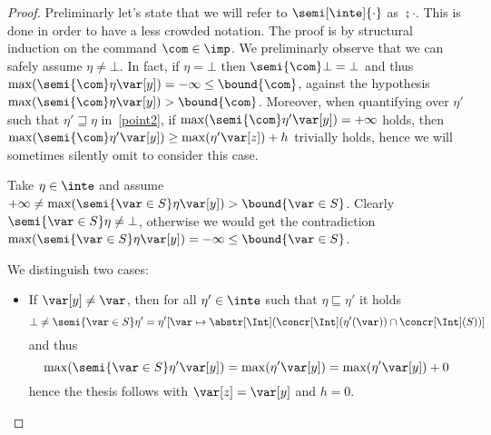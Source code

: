 \begin{proof}
  Preliminarly let's state that we will refer to
  \(\semi[\inte]{\cdot}\) as \(\semi{\cdot}\). This is done in order
  to have a less crowded notation. The proof is by structural
  induction on the command \(\com\in \imp\).
  We preliminarly observe that we can safely assume
  \(\eta \neq \bot\).
  In fact, if \(\eta = \bot\) then \(\semi{\com} \bot = \bot\) and
  thus \(\max(\semi{\com} \eta \var[y]) = -\infty \leq \bound{\com}\),
  against the hypothesis
  \(\max(\semi{\com}\eta \var[y]) > \bound{\com}\). Moreover, when
  quantifying over \(\eta'\) such that \(\eta' \sqsupseteq \eta\)
  in~\ref{point2}, if \(\max(\semi{\com}\eta' \var[y]) = + \infty\)
  holds, then
  \(\max(\semi{\com}\eta' \var[y]) \geq \max(\eta' \var[z]) + h\)
  trivially holds, hence we will sometimes silently omit to consider
  this case.
  \begin{inductive}
    Take \(\eta \in \inte\) and assume
    \(+\infty\neq\max(\semi{\var \in S}\eta \var[y]) > \bound{\var \in S}\).
    Clearly \(\semi{\var \in S}\eta \neq \bot\), otherwise we would get
    the contradiction
    \(\max(\semi{\var \in S}\eta \var[y]) = -\infty \leq \bound{\var \in
      S}\).
    
    We distinguish two cases:
    \begin{itemize}
      
    \item If \(\var[y] \neq \var\), then for all \(\eta' \in \inte\) such
      that \(\eta \sqsubseteq \eta'\) it holds
      \[\bot \neq \semi{\var \in S}\eta' = \eta'[\var \mapsto
        {\abstr[\Int](\concr[\Int](\eta'(\var)) \cap \concr[\Int](S))}]\]
      and thus
      \begin{equation*}
        \max(\semi{\var \in S}\eta' \var[y]) = \max(\eta' \var[y]) = \max(\eta' \var[y]) + 0
      \end{equation*}
      hence the thesis follows with \(\var[z]=\var[y]\) and \(h = 0\).


\end{itemize}
\end{inductive}
\end{proof}
